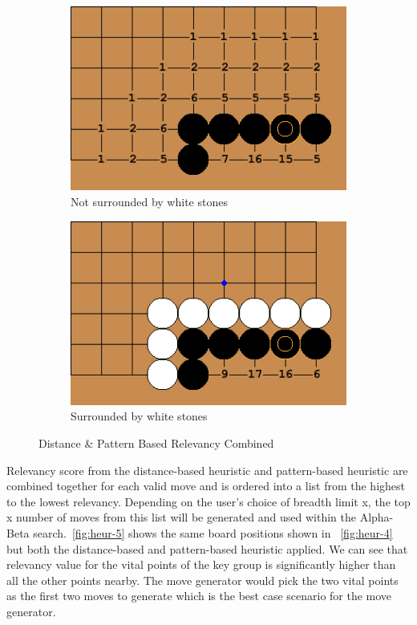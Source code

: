 \documentclass{l4proj}
\begin{document}
\begin{figure}[!ht]
\centering
\begin{subfigure}[b]{0.35\textwidth}
\centering
\includegraphics[width=\textwidth]{heur/5a.png}
\caption{Not surrounded by white stones}
\label{fig:heur-5a}
\end{subfigure}
\begin{subfigure}[b]{0.35\textwidth}
\centering
\includegraphics[width=\textwidth]{heur/5b.png}
\caption{Surrounded by white stones}
\label{fig:heur-5b}
\end{subfigure}
\caption{Distance \& Pattern Based Relevancy Combined}
\label{fig:heur-5}
\end{figure}


Relevancy score from the distance-based heuristic and pattern-based heuristic are combined together for each valid move and is ordered into a list from the highest to the lowest relevancy.  Depending on the user’s choice of breadth limit x,  the top x number of moves from this list will be generated and used  within the Alpha-Beta search.~\autoref{fig:heur-5} shows the same board positions shown in  ~\autoref{fig:heur-4} but both the distance-based and pattern-based heuristic applied. We can see that relevancy value for the vital points of the key group is significantly higher than all the other points nearby. The move generator would pick the two vital points as the first two moves to generate which is the best case scenario for the move generator.
\end{document}
